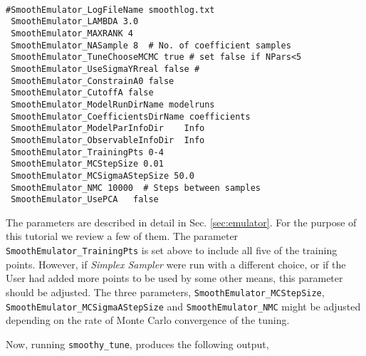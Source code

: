 \documentclass[UserManual.tex]{subfiles}
\begin{document}
{\tt
\begin{verbatim}
#SmoothEmulator_LogFileName smoothlog.txt
 SmoothEmulator_LAMBDA 3.0
 SmoothEmulator_MAXRANK 4
 SmoothEmulator_NASample 8  # No. of coefficient samples
 SmoothEmulator_TuneChooseMCMC true # set false if NPars<5
 SmoothEmulator_UseSigmaYRreal false # 
 SmoothEmulator_ConstrainA0 false
 SmoothEmulator_CutoffA false
 SmoothEmulator_ModelRunDirName modelruns
 SmoothEmulator_CoefficientsDirName coefficients
 SmoothEmulator_ModelParInfoDir    Info
 SmoothEmulator_ObservableInfoDir  Info
 SmoothEmulator_TrainingPts 0-4
 SmoothEmulator_MCStepSize 0.01
 SmoothEmulator_MCSigmaAStepSize 50.0
 SmoothEmulator_NMC 10000  # Steps between samples 
 SmoothEmulator_UsePCA   false
\end{verbatim}
}
The parameters are described in detail in Sec. \ref{sec:emulator}. For the purpose of this tutorial we review a few of them. The parameter {\tt SmoothEmulator\_TrainingPts} is set above to include all five of the training points. However, if {\it Simplex Sampler} were run with a different choice, or if the User had added more points to be used by some other means, this parameter should be adjusted. The three parameters, {\tt SmoothEmulator\_MCStepSize}, {\tt SmoothEmulator\_MCSigmaAStepSize} and {\tt SmoothEmulator\_NMC} might be adjusted depending on the rate of Monte Carlo convergence of the tuning.

Now, running {\tt smoothy\_tune}, produces the following output,
\end{document}
